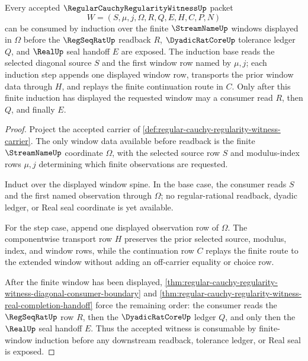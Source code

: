 \begin{theorem}
\label{thm:regular-cauchy-regularity-witness-finite-window-induction}
Every accepted $\RegularCauchyRegularityWitnessUp$ packet
$$
W=(S,\mu,j,\Omega,R,Q,E,H,C,P,N)
$$
can be consumed by induction over the finite $\StreamNameUp$ windows displayed in $\Omega$ before the $\RegSeqRatUp$ readback $R$, $\DyadicRatCoreUp$ tolerance ledger $Q$, and $\RealUp$ seal handoff $E$ are exposed. The induction base reads the selected diagonal source $S$ and the first window row named by $\mu,j$; each induction step appends one displayed window row, transports the prior window data through $H$, and replays the finite continuation route in $C$. Only after this finite induction has displayed the requested window may a consumer read $R$, then $Q$, and finally $E$.
\end{theorem}
\begin{proof}
Project the accepted carrier of \autoref{def:regular-cauchy-regularity-witness-carrier}. The only window data available before readback is the finite $\StreamNameUp$ coordinate $\Omega$, with the selected source row $S$ and modulus-index rows $\mu,j$ determining which finite observations are requested.

Induct over the displayed window spine. In the base case, the consumer reads $S$ and the first named observation through $\Omega$; no regular-rational readback, dyadic ledger, or Real seal coordinate is yet available.

For the step case, append one displayed observation row of $\Omega$. The componentwise transport row $H$ preserves the prior selected source, modulus, index, and window rows, while the continuation row $C$ replays the finite route to the extended window without adding an off-carrier equality or choice row.

After the finite window has been displayed, \autoref{thm:regular-cauchy-regularity-witness-diagonal-consumer-boundary} and \autoref{thm:regular-cauchy-regularity-witness-real-completion-handoff} force the remaining order: the consumer reads the $\RegSeqRatUp$ row $R$, then the $\DyadicRatCoreUp$ ledger $Q$, and only then the $\RealUp$ seal handoff $E$. Thus the accepted witness is consumable by finite-window induction before any downstream readback, tolerance ledger, or Real seal is exposed.
\end{proof}

